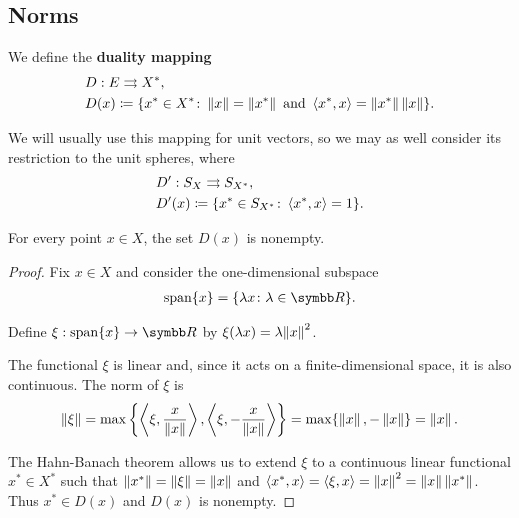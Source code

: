 \subsection{Norms}\label{subsec:norms}

\begin{definition}\cite[Example 2.26]{Phelps1993}
  We define the \textbf{duality mapping}
  \begin{align*}
    &D: E \rightrightarrows X^*, \\
    &D(x) \coloneqq \{ x^* \in X^* \colon \left\Vert x \right\Vert = \left\Vert x^* \right\Vert \text{ and } \left\langle x^*, x \right\rangle = \left\Vert x^* \right\Vert \left\Vert x \right\Vert \}.
  \end{align*}
\end{definition}

\begin{note}
  We will usually use this mapping for unit vectors, so we may as well consider its restriction to the unit spheres, where
  \begin{align*}
    &D': S_X \rightrightarrows S_{X^*}, \\
    &D'(x) \coloneqq \{ x^* \in S_{X^*} \colon \left\langle x^*, x \right\rangle = 1 \}.
  \end{align*}
\end{note}

\begin{lemma}\label{thm:nonempty_banach_duality_mapping}
  For every point \( x \in X \), the set \( D(x) \) is nonempty.
\end{lemma}
\begin{proof}
  Fix \( x \in X \) and consider the one-dimensional subspace
  \begin{align*}
    \Span \{ x \}
    =
    \{ \lambda x \colon \lambda \in \BB{R} \}.
  \end{align*}

  Define \( \xi: \Span \{ x \} \to \BB{R} \) by \( \xi(\lambda x) = \lambda {\left\Vert x \right\Vert}^2 \).

  The functional \( \xi \) is linear and, since it acts on a finite-dimensional space, it is also continuous. The norm of \( \xi \) is
  \begin{equation*}
    \left\Vert \xi \right\Vert = \max \left\{ \left\langle \xi, \frac x {\left\Vert x \right\Vert} \right\rangle, \left\langle \xi, -\frac x {\left\Vert x \right\Vert} \right\rangle \right\} = \max \{ \left\Vert x \right\Vert, -\left\Vert x \right\Vert \} = \left\Vert x \right\Vert.
  \end{equation*}

  The Hahn-Banach theorem allows us to extend \( \xi \) to a continuous linear functional \( x^* \in X^* \) such that \( \left\Vert x^* \right\Vert = \left\Vert \xi \right\Vert = \left\Vert x \right\Vert \) and \( \left\langle x^*, x \right\rangle = \left\langle \xi, x \right\rangle = \left\Vert x \right\Vert^2 = \left\Vert x \right\Vert \left\Vert x^* \right\Vert \). Thus \( x^* \in D(x) \) and \( D(x) \) is nonempty.
\end{proof}

